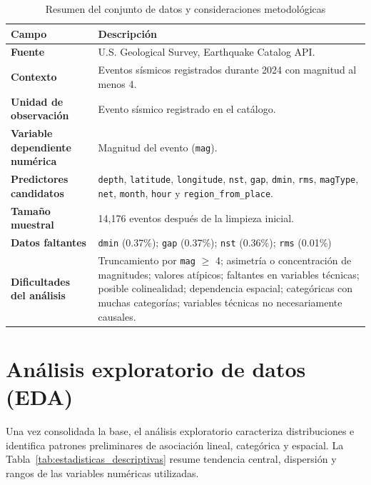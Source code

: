 \documentclass{style}
\newcommand{\var}[1]{\texttt{#1}}
\begin{document}
\begin{table}[H]
    \centering
    \caption{Resumen del conjunto de datos y consideraciones metodológicas}
    \label{tab:ficha_datos}
    \scriptsize
    \begin{tabularx}{\textwidth}{lX}
    \toprule
    \textbf{Campo} & \textbf{Descripción} \\
    \midrule
    \textbf{Fuente} & U.S. Geological Survey, Earthquake Catalog API. \\
    \textbf{Contexto} & Eventos sísmicos registrados durante 2024 con magnitud al menos 4. \\
    \textbf{Unidad de observación} & Evento sísmico registrado en el catálogo. \\
    \textbf{Variable dependiente numérica} & Magnitud del evento (\var{mag}). \\
    \textbf{Predictores candidatos} & \var{depth}, \var{latitude}, \var{longitude}, \var{nst}, \var{gap}, \var{dmin}, \var{rms}, \var{magType}, \var{net}, \var{month}, \var{hour} y \var{region\_from\_place}. \\
    \textbf{Tamaño muestral} & 14,176 eventos después de la limpieza inicial. \\
    \textbf{Datos faltantes} & \var{dmin} (0.37\%); \var{gap} (0.37\%); \var{nst} (0.36\%); \var{rms} (0.01\%) \\
    \textbf{Dificultades del análisis} & Truncamiento por \var{mag} $\ge$ 4; asimetría o concentración de magnitudes; valores atípicos; faltantes en variables técnicas; posible colinealidad; dependencia espacial; categóricas con muchas categorías; variables técnicas no necesariamente causales. \\
    \bottomrule
    \end{tabularx}
\end{table}


\section{Análisis exploratorio de datos (EDA) }

Una vez consolidada la base, el análisis exploratorio caracteriza distribuciones e identifica patrones preliminares de asociación lineal, categórica y espacial. La Tabla~\ref{tab:estadisticas_descriptivas} resume tendencia central, dispersión y rangos de las variables numéricas utilizadas.
\end{document}
